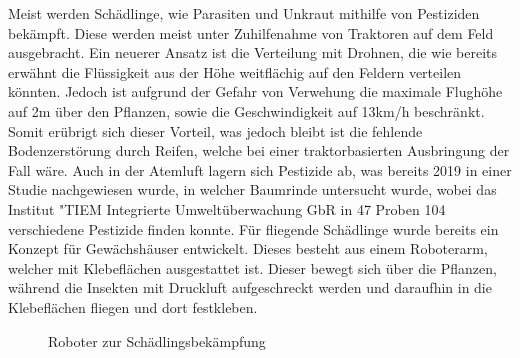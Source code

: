 Meist werden Schädlinge, wie Parasiten und Unkraut mithilfe von Pestiziden
bekämpft. Diese werden meist unter Zuhilfenahme von Traktoren auf dem Feld
ausgebracht. Ein neuerer Ansatz ist die Verteilung mit Drohnen, die wie bereits
erwähnt die Flüssigkeit aus der Höhe weitflächig auf den Feldern verteilen
könnten. Jedoch ist aufgrund der Gefahr von Verwehung die maximale Flughöhe auf
2m über den Pflanzen, sowie die Geschwindigkeit auf 13km/h
beschränkt.\cite{bvl} Somit erübrigt sich dieser Vorteil, was jedoch bleibt ist
die fehlende Bodenzerstörung durch Reifen, welche bei einer traktorbasierten
Ausbringung der Fall wäre. Auch in der Atemluft lagern sich Pestizide ab, was
bereits 2019 in einer Studie nachgewiesen wurde, in welcher Baumrinde
untersucht wurde, wobei das Institut "TIEM Integrierte Umweltüberwachung GbR in
47 Proben 104 verschiedene Pestizide finden
konnte.\cite{clausing2020baumrinden} Für fliegende Schädlinge wurde bereits ein
Konzept für Gewächshäuser entwickelt. Dieses besteht aus einem Roboterarm,
welcher mit Klebeflächen ausgestattet ist. Dieser bewegt sich über die
Pflanzen, während die Insekten mit Druckluft aufgeschreckt werden und daraufhin
in die Klebeflächen fliegen und dort festkleben.

\begin{figure}[!h]
    \centering
    
    \caption{Roboter zur Schädlingsbekämpfung}
    \label{fig:schaedlingsbekaempfung}
\end{figure}